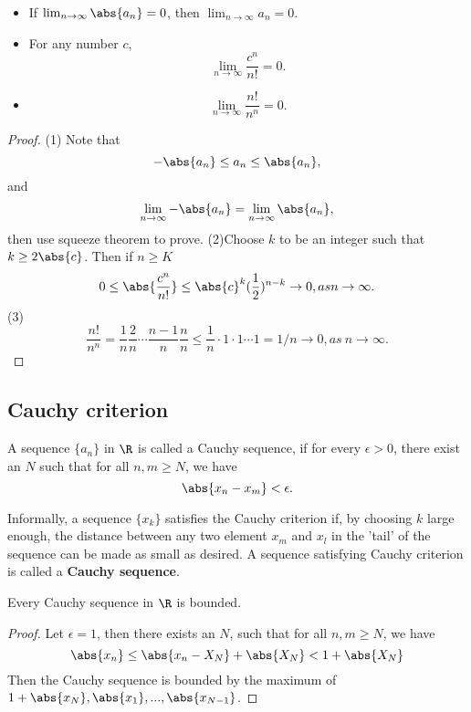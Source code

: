 \begin{refsection}
\begin{corollary}\hfill
\begin{itemize}
	\item If $\lim_{n\to \infty} \abs{a_n} = 0$, then $\lim_{n\to \infty} a_n = 0.$ 
	\item For any number $c$, 
	$$\lim_{n\to \infty} \frac{c^n}{n!} = 0.$$	
	\item $$\lim_{n\to\infty} \frac{n!}{n^n} = 0.$$
\end{itemize}
\end{corollary}
\begin{proof}
(1) Note that 
$$-\abs{a_n} \leq a_n \leq \abs{a_n},$$
and
$$\lim_{n\to \infty}-\abs{a_n} =\lim_{n\to \infty} \abs{a_n},$$
then use squeeze theorem to prove.	
(2)Choose $k$ to be an integer such that $k\geq 2\abs{c}$. Then if $n\geq K$
$$0\leq \abs{\frac{c^n}{n!}} \leq \abs{c}^k (\frac{1}{2})^{n-k} \to 0, as n\to \infty.$$
(3)
$$\frac{n!}{n^n}= \frac{1}{n}\frac{2}{n}\cdots \frac{n-1}{n}\frac{n}{n} \leq \frac{1}{n}\cdot 1 \cdot 1 \cdots 1 = 1/n \to 0, as~n\to \infty. $$
\end{proof}

\subsection{Cauchy criterion}
\begin{definition}\cite[59]{johnsonbaugh2010foundations}
A sequence $\{a_n\}$ in $\R$ is called a Cauchy sequence, if for every $\epsilon > 0$, there exist an $N$ such that for all $n,m\geq N$, we have
$$\abs{x_n-x_m} < \epsilon.$$
\end{definition}

\begin{remark}[interpretation]
	Informally, a sequence $\{x_k\}$ satisfies the Cauchy criterion if, by choosing $k$ large enough, the distance between any two element $x_m$ and $x_l$ in the 'tail' of the sequence can be made as small as desired. A sequence satisfying Cauchy criterion is called a \textbf{Cauchy sequence}. 	
\end{remark}

\begin{lemma}
	Every Cauchy sequence in $\R$ is bounded.
\end{lemma}
\begin{proof}
	Let $\epsilon = 1$, then there exists an $N$, such that for all $n,m \geq N$, we have
	$$\abs{x_n} \leq \abs{x_n - X_N} + \abs{X_N} < 1 + \abs{X_N} $$
Then the Cauchy sequence is bounded by the maximum of $1 + \abs{x_N}, \abs{x_1},...,\abs{x_{N-1}}$.
\end{proof}



\end{refsection}
